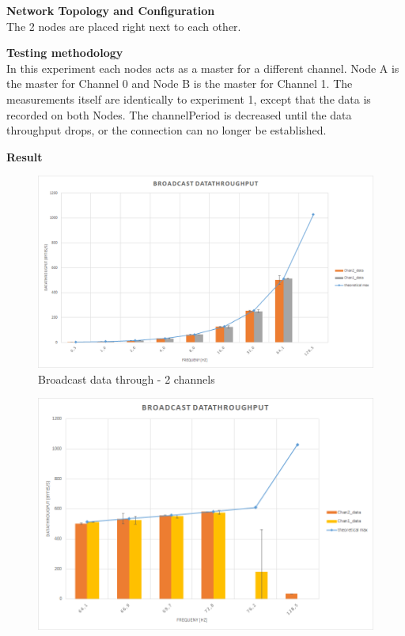 \begin{description}
	\item{\textbf{Network Topology and Configuration}} \hfill \\ The 2 nodes are placed right next to each other.
	\item{\textbf{Testing methodology}} \hfill \\ In this experiment each nodes acts as a master for a different channel. Node A is the master for Channel 0 and Node B is the master for Channel 1. The measurements itself are identically to experiment 1, except that the data is recorded on both Nodes. The channelPeriod is decreased until the data throughput drops, or the connection can no longer be established.
	\item{\textbf{Result}} \hfill \\  	
	\begin{figure}[h]
		\centering
		\includegraphics[scale=0.5]{./pics/exp2_norm.png}
		\caption{Broadcast data through - 2 channels}\label{fig:exp2low}
	\end{figure}
	\begin{figure}[h]
		\centering
		\includegraphics[scale=0.5]{./pics/exp2_detail.png}

\end{figure}
\end{description}
